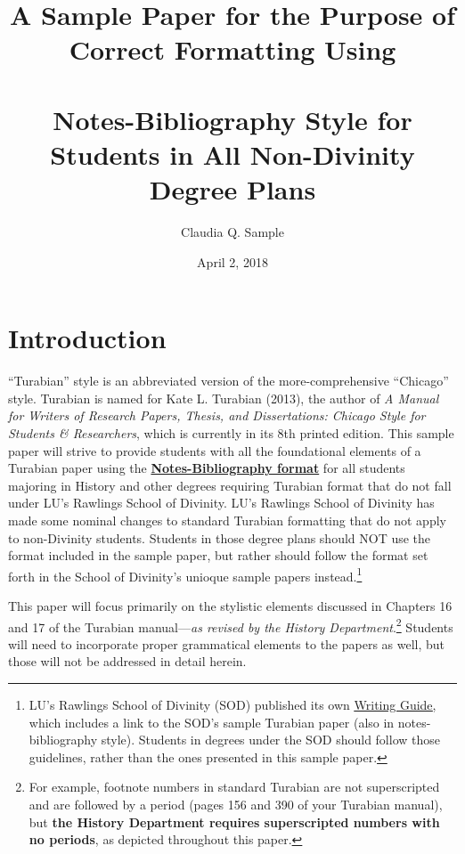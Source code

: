 \documentclass[raggedright]{turabian-researchpaper}
\title{\normalfont A Sample Paper for the Purpose of Correct Formatting Using
  \\\ \\ \textbf{Notes-Bibliography} Style for Students in All
  \textbf{Non-Divinity} Degree Plans}
\author{Claudia Q. Sample}
\date{April 2, 2018}
\newcommand*{\bluehref}[2]{\href{#1}{\color{blue}\underline{#2}}}
\begin{document}
\maketitle

\setcounter{page}{2}
\setcounter{tocdepth}{2}
\tableofcontents
\clearpage
{}

\section{Introduction}

``Turabian'' style is an abbreviated version of the more-comprehensive
``Chicago'' style. Turabian is named for Kate L. Turabian (2013), the author of
\textit{A Manual for Writers of Research Papers, Thesis, and Dissertations:
Chicago Style for Students \& Researchers}, which is currently in its 8th
printed edition.\autocite{Turabian} This sample paper will strive to provide
students with all the foundational elements of a Turabian paper using the
\textbf{\underline{Notes-Bibliography format}} for all students majoring in
History and other degrees requiring Turabian format that do not fall under LU's
Rawlings School of Divinity. LU's Rawlings School of Divinity has made some
nominal changes to standard Turabian formatting that do not apply to
non-Divinity students. Students in those degree plans should NOT use the format
included in the sample paper, but rather should follow the format set forth in
the School of Divinity's unioque sample papers instead.\footnote{LU's Rawlings
School of Divinity (SOD) published its own
\bluehref{http://www.liberty.edu/divinity/index.cfm?PID=28160}{Writing Guide},
which includes a link to the SOD's sample Turabian paper (also in
notes-bibliography style). Students in degrees under the SOD should follow those
guidelines, rather than the ones presented in this sample paper.}

This paper will focus primarily on the stylistic elements discussed in Chapters
16 and 17 of the Turabian manual\autocite[144-215]{Turabian}---\emph{as revised
by the History Department}.\footnote{For example, footnote numbers in standard
Turabian are not superscripted and are followed by a period (pages 156 and 390
of your Turabian manual), but \textbf{the History Department requires
superscripted numbers with no periods}, as depicted throughout this paper.}
Students will need to incorporate proper grammatical elements to the papers as
well, but those will not be addressed in detail herein.
\end{document}
